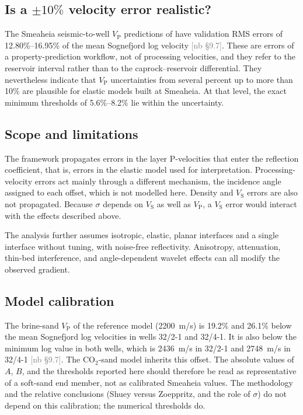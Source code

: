 \documentclass[11pt]{article}
\newcommand{\VP}{V_\mathrm{P}}
\newcommand{\VS}{V_\mathrm{S}}
\newif\ifshownb \shownbtrue
\newcommand{\nb}[1]{\ifshownb\textcolor{gray}{[nb #1]}\fi}
\begin{document}
\subsection*{Is a $\pm10\%$ velocity error realistic?}

The Smeaheia seismic-to-well $\VP$ predictions of \citet{hema2027} have validation RMS errors of 12.80\%--16.95\% of the mean Sognefjord log velocity \nb{\S9.7}. These are errors of a property-prediction workflow, not of processing velocities, and they refer to the reservoir interval rather than to the caprock--reservoir differential. They nevertheless indicate that $\VP$ uncertainties from several percent up to more than 10\% are plausible for elastic models built at Smeaheia. At that level, the exact minimum thresholds of 5.6\%--8.2\% lie within the uncertainty.

\subsection*{Scope and limitations}

The framework propagates errors in the layer P-velocities that enter the reflection coefficient, that is, errors in the elastic model used for interpretation. Processing-velocity errors act mainly through a different mechanism, the incidence angle assigned to each offset, which is not modelled here. Density and $\VS$ errors are also not propagated. Because $\sigma$ depends on $\VS$ as well as $\VP$, a $\VS$ error would interact with the effects described above.

The analysis further assumes isotropic, elastic, planar interfaces and a single interface without tuning, with noise-free reflectivity. Anisotropy, attenuation, thin-bed interference, and angle-dependent wavelet effects can all modify the observed gradient.

\subsection*{Model calibration}

The brine-sand $\VP$ of the reference model (\SI{2200}{m/s}) is 19.2\% and 26.1\% below the mean Sognefjord log velocities in wells 32/2-1 and 32/4-1. It is also below the minimum log value in both wells, which is \SI{2436}{m/s} in 32/2-1 and \SI{2748}{m/s} in 32/4-1 \citep[][their Tables 1 and 2]{hema2027} \nb{\S9.7}. The CO$_2$-sand model inherits this offset. The absolute values of $A$, $B$, and the thresholds reported here should therefore be read as representative of a soft-sand end member, not as calibrated Smeaheia values. The methodology and the relative conclusions (Shuey versus Zoeppritz, and the role of $\sigma$) do not depend on this calibration; the numerical thresholds do.
\end{document}
